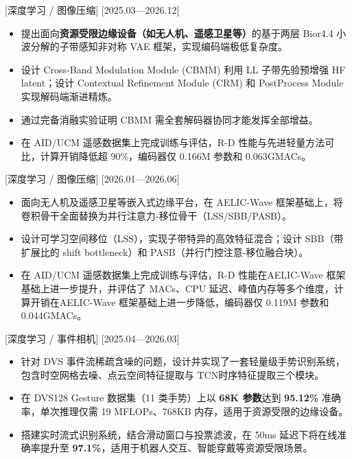 \documentclass{resume}
\begin{document}
[深度学习 / 图像压缩]
[2025.03—2026.12]
\begin{itemize}
  \item 提出面向\textbf{资源受限边缘设备（如无人机、遥感卫星等）}的基于两层 Bior4.4 小波分解的子带感知非对称 VAE 框架，实现编码端极低复杂度。
  \item 设计 Cross-Band Modulation Module (CBMM) 利用 LL 子带先验预增强 HF latent；设计 Contextual Refinement Module (CRM) 和 PostProcess Module 实现解码端渐进精炼。
  \item 通过完备消融实验证明 CBMM 需全套解码器协同才能发挥全部增益。
  \item 在 AID/UCM 遥感数据集上完成训练与评估，R-D 性能与先进轻量方法可比，计算开销降低超 90\%，编码器仅 0.166M 参数和 0.063GMACs。
\end{itemize}

[深度学习 / 图像压缩]
[2026.01—2026.06]
\begin{itemize}
  \item 面向无人机及遥感卫星等嵌入式边缘平台，在 AELIC-Wave 框架基础上，将卷积骨干全面替换为并行注意力-移位骨干（LSS/SBB/PASB）。
  \item 设计可学习空间移位（LSS），实现子带特异的高效特征混合；设计 SBB（带扩展比的 shift bottleneck）和 PASB（并行门控注意-移位融合块）。
  \item 在 AID/UCM 遥感数据集上完成训练与评估，R-D 性能在AELIC-Wave 框架基础上进一步提升，并评估了 MACs、CPU 延迟、峰值内存等多个维度，计算开销在AELIC-Wave 框架基础上进一步降低，编码器仅 0.119M 参数和 0.044GMACs。
\end{itemize}

[深度学习 / 事件相机]
[2025.04—2026.03]
\begin{itemize}
  \item 针对 DVS 事件流稀疏含噪的问题，设计并实现了一套轻量级手势识别系统，包含时空网格去噪、点云空间特征提取与 TCN时序特征提取三个模块。
  \item 在 DVS128 Gesture 数据集（11 类手势）上以 \textbf{68K 参数}达到 \textbf{95.12\%} 准确率，单次推理仅需 19 MFLOPs、768KB 内存，适用于资源受限的边缘设备。
  \item 搭建实时流式识别系统，结合滑动窗口与投票滤波，在 50ms 延迟下将在线准确率提升至 \textbf{97.1\%}，适用于机器人交互、智能穿戴等资源受限场景。
\end{itemize}
\end{document}
